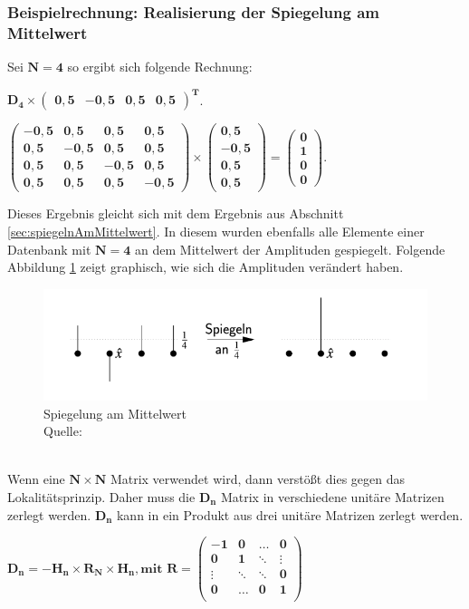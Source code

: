 \subsubsection{Beispielrechnung: Realisierung der Spiegelung am Mittelwert}
\label{seg:bspSpiegelungAmMittelwert}
Sei $\mathbf{N = 4}$ so ergibt sich folgende Rechnung:
\begin{center}
 $\mathbf{D_4  \times \begin{pmatrix}
		0,5 & -0,5 & 0,5 & 0,5
\end{pmatrix}^T}$.

$\mathbf{\begin{pmatrix}
		-0,5 & 0,5 &0,5&0,5\\
		0,5 & -0,5 &0,5&0,5\\
		0,5 & 0,5 &-0,5&0,5\\
		0,5 & 0,5 &0,5&-0,5
	\end{pmatrix}
	\times \begin{pmatrix} 0,5 \\ -0,5 \\ 0,5 \\ 0,5 \end{pmatrix} = \begin{pmatrix} 0\\1\\0\\0 \end{pmatrix}
}$.
\end{center}
Dieses Ergebnis gleicht sich mit dem Ergebnis aus Abschnitt \ref{sec:spiegelnAmMittelwert}. In diesem wurden ebenfalls alle Elemente einer Datenbank mit $\mathbf{N=4}$ an dem Mittelwert der Amplituden gespiegelt. Folgende Abbildung \ref{fig:spiegelung} zeigt graphisch, wie sich die Amplituden verändert haben.
\begin{figure}[hbtp]
	\centering
	\includegraphics[width=.8\textwidth]{figures/spiegelung.png}
	\caption{Spiegelung am Mittelwert \\ Quelle: \cite[S. 142]{Ho17}}
	\label{fig:spiegelung}
\end{figure}
\noindent
\\
Wenn eine $\mathbf{N \times N}$ Matrix verwendet wird, dann verstößt dies gegen das Lokalitätsprinzip. Daher muss die $\mathbf{D_n}$ Matrix in verschiedene unitäre Matrizen zerlegt werden.  $\mathbf{D_n}$ kann in ein Produkt aus drei unitäre Matrizen zerlegt werden.
\begin{center}
$\mathbf{D_n = -H_n \times R_N \times H_n, \text{mit } R  = 
\begin{pmatrix}
		-1 & 0 &\dots& 0 \\
		0& 1& \ddots& \vdots\\
		\vdots &\ddots& \ddots&0 \\
		0& \dots& 0 &1 \\
\end{pmatrix}}$
\end{center}
